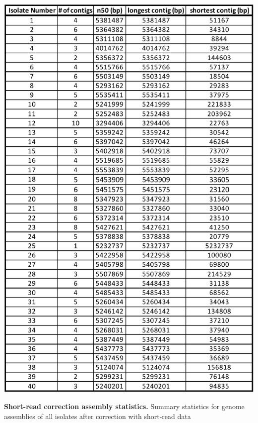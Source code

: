 \begin{table}[!ht]
\centering
\includegraphics[width = .7\linewidth,keepaspectratio]{figure/asmpilon.pdf}
\caption[Short-read correction assembly statistics]{{\bf Short-read correction assembly statistics.} Summary statistics for genome assemblies of all isolates after correction with short-read data }
\label{tab:asmpilon}
\end{table}


